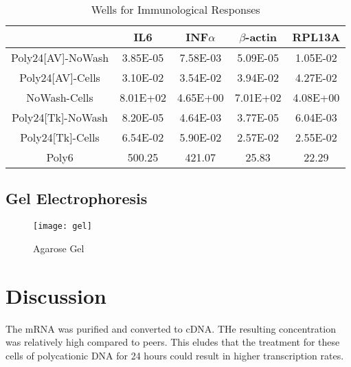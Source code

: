 \documentclass[journal, a4paper]{IEEEtran}
\begin{document}
    \begin{table}[!hbt]
      \begin{center}
      \caption{Wells for Immunological Responses}
      \label{tab:simParameters}
      \begin{tabular}{|c|c|c|c|c|}
        \hline
        & IL6 & INF$\alpha$ & $\beta$-actin & RPL13A \\
        \hline
        Poly24[AV]-NoWash & 3.85E-05 & 7.58E-03 & 5.09E-05 & 1.05E-02 \\
        \hline
        Poly24[AV]-Cells & 3.10E-02 & 3.54E-02 & 3.94E-02 & 4.27E-02 \\
        \hline
        NoWash-Cells & 8.01E+02 & 4.65E+00 & 7.01E+02 & 4.08E+00 \\
        \hline
        Poly24[Tk]-NoWash & 8.20E-05 & 4.64E-03 & 3.77E-05 & 6.04E-03\\
        \hline
        Poly24[Tk]-Cells & 6.54E-02 & 5.90E-02 & 2.57E-02 & 2.55E-02\\
        \hline
        Poly6 & 500.25 & 421.07 & 25.83 & 22.29 \\
        \hline
      \end{tabular}
      \end{center}
    \end{table}

  \subsection{Gel Electrophoresis}

    \begin{figure}[t]
      \centering
      \texttt{[image: gel]}
      \caption{Agarose Gel}
      \label{fig:mesh1}
    \end{figure}

\section{Discussion}

The mRNA was purified and converted to cDNA. THe resulting concentration was relatively high compared to peers. This eludes that the
treatment for these cells of polycationic DNA for 24 hours could result in higher transcription rates.
\end{document}
